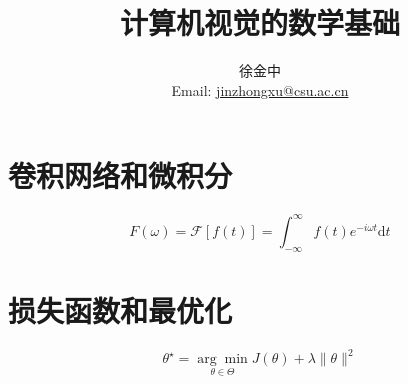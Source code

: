 \documentclass{article}
\title{计算机视觉的数学基础}
\author{徐金中 \\ Email: \href{mailto:jinzhongxu@csu.ac.cn}{jinzhongxu@csu.ac.cn}}
\begin{document}
\maketitle





\section{卷积网络和微积分}







\begin{equation}\label{fft}
	F(\omega) = \mathcal{F}[f(t)] = \int_{-\infty}^{\infty} f(t)e^{-i\omega t} \mathrm{d}t
\end{equation}

\section{损失函数和最优化}

\begin{equation*}
	\theta^{\star} = \underset{\theta \in \Theta}{\arg \min} J(\theta) + \lambda \|\theta\|^2
\end{equation*} 
\end{document}
